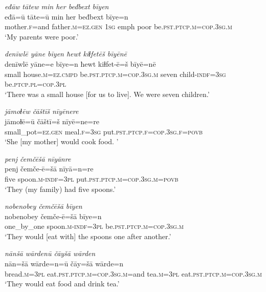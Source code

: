 \ea \label{ŽE.43}
\textit{eđāw tātew min her beđbext bīyen} \\ 
\gll eđā=ū tāte=ū min her beđbext bīye=n \\ 
 mother\textsc{.f}=and father\textsc{.m}\textsc{\textsc{=ez.gen}} \textsc{1sg} emph poor be\textsc{.pst}\textsc{.ptcp}\textsc{.m}\textsc{=cop}\textsc{.3sg}\textsc{.m} \\ 
\glt `My parents were poor.'
\z 
 
\ea \label{ŽE.44}
\textit{denīwlē yāne bīyen ħewt kiɫfetēš bīyēnē} \\ 
\gll denīwlē yāne=e bīye=n ħewt kiɫfet-ē=š bīyē=nē \\ 
 small house\textsc{.m}\textsc{=ez}\textsc{.cmpd} be\textsc{.pst}\textsc{.ptcp}\textsc{.m}\textsc{=cop}\textsc{.3sg}\textsc{.m} seven child\textsc{-indf}\textsc{=3sg} be\textsc{.ptcp}\textsc{.pl}\textsc{=cop}\textsc{.3pl} \\ 
\glt `There was a small house [for us to live]. We were seven children.'
\z 
 
\ea \label{ŽE.45}
\textit{jāmoɫēw čāštīš nīyēnere} \\ 
\gll jāmoɫē=ū čāštī=š nīyē=ne=re \\ 
 small\_pot\textsc{\textsc{=ez.gen}} meal\textsc{.f}\textsc{=3sg} put\textsc{.pst}\textsc{.ptcp}\textsc{.f}\textsc{=cop}\textsc{.3sg}\textsc{.f}\textsc{=\textsc{povb}} \\ 
\glt `She [my mother] would cook food. '
\z 
 
\ea \label{ŽE.46}
\textit{penj čemčēšā nīyānre} \\ 
\gll penj čemče-ē=šā nīyā=n=re \\ 
 five spoon\textsc{.m}\textsc{-indf}\textsc{=3pl} put\textsc{.pst}\textsc{.ptcp}\textsc{.m}\textsc{=cop}\textsc{.3sg}\textsc{.m}\textsc{=\textsc{povb}} \\ 
\glt `They (my family) had five spoons.'
\z 
 
\ea \label{ŽE.47}
\textit{nobenobey čemčēšā bīyen} \\ 
\gll nobenobey čemče-ē=šā bīye=n \\ 
 one\_by\_one spoon\textsc{.m}\textsc{-indf}\textsc{=3pl} be\textsc{.pst}\textsc{.ptcp}\textsc{.m}\textsc{=cop}\textsc{.3sg}\textsc{.m} \\ 
\glt `They would [eat with] the spoons one after another.'
\z 
 
\ea \label{ŽE.48}
\textit{nānšā wārdenū čāyšā wārden} \\ 
\gll nān=šā wārde=n=ū čāy=šā wārde=n \\ 
 bread\textsc{.m}\textsc{=3pl} eat\textsc{.pst}\textsc{.ptcp}\textsc{.m}\textsc{=cop}\textsc{.3sg}\textsc{.m}=and tea\textsc{.m}\textsc{=3pl} eat\textsc{.pst}\textsc{.ptcp}\textsc{.m}\textsc{=cop}\textsc{.3sg}\textsc{.m} \\ 
\glt `They would eat food and drink tea.'
\z 
 
